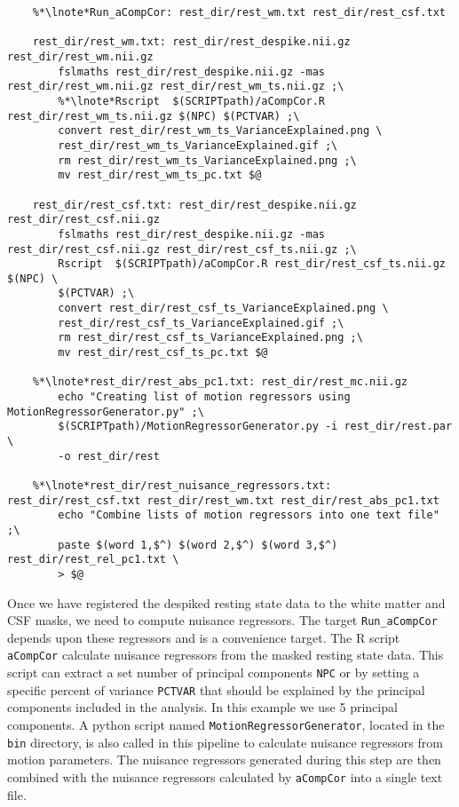 \begin{lstlisting}
	%*\lnote*Run_aCompCor: rest_dir/rest_wm.txt rest_dir/rest_csf.txt

	rest_dir/rest_wm.txt: rest_dir/rest_despike.nii.gz rest_dir/rest_wm.nii.gz
		fslmaths rest_dir/rest_despike.nii.gz -mas rest_dir/rest_wm.nii.gz rest_dir/rest_wm_ts.nii.gz ;\
		%*\lnote*Rscript  $(SCRIPTpath)/aCompCor.R rest_dir/rest_wm_ts.nii.gz $(NPC) $(PCTVAR) ;\
		convert rest_dir/rest_wm_ts_VarianceExplained.png \
		rest_dir/rest_wm_ts_VarianceExplained.gif ;\
		rm rest_dir/rest_wm_ts_VarianceExplained.png ;\
		mv rest_dir/rest_wm_ts_pc.txt $@

	rest_dir/rest_csf.txt: rest_dir/rest_despike.nii.gz rest_dir/rest_csf.nii.gz
		fslmaths rest_dir/rest_despike.nii.gz -mas rest_dir/rest_csf.nii.gz rest_dir/rest_csf_ts.nii.gz ;\
		Rscript  $(SCRIPTpath)/aCompCor.R rest_dir/rest_csf_ts.nii.gz $(NPC) \
		$(PCTVAR) ;\
		convert rest_dir/rest_csf_ts_VarianceExplained.png \
		rest_dir/rest_csf_ts_VarianceExplained.gif ;\
		rm rest_dir/rest_csf_ts_VarianceExplained.png ;\
		mv rest_dir/rest_csf_ts_pc.txt $@
		
	%*\lnote*rest_dir/rest_abs_pc1.txt: rest_dir/rest_mc.nii.gz
		echo "Creating list of motion regressors using MotionRegressorGenerator.py" ;\
		$(SCRIPTpath)/MotionRegressorGenerator.py -i rest_dir/rest.par \
		-o rest_dir/rest
		
	%*\lnote*rest_dir/rest_nuisance_regressors.txt: rest_dir/rest_csf.txt rest_dir/rest_wm.txt rest_dir/rest_abs_pc1.txt
		echo "Combine lists of motion regressors into one text file" ;\
		paste $(word 1,$^) $(word 2,$^) $(word 3,$^) rest_dir/rest_rel_pc1.txt \
		> $@
\end{lstlisting}

Once we have registered the despiked resting state data to the white matter and CSF masks, we need to compute nuisance regressors.  The target \texttt{Run_aCompCor} depends upon these regressors and is a convenience target.  The R script \texttt{aCompCor} calculate nuisance regressors from the masked resting state data. This script can extract a set number of principal components \texttt{NPC} or by setting a specific percent of variance \texttt{PCTVAR} that should be explained by the principal components included in the analysis. In this example we use 5 principal components. 
 \lnum{19}  A python script named \texttt{MotionRegressorGenerator}, located in the \texttt{bin} directory, is also called in this pipeline to calculate nuisance regressors from motion parameters.  The nuisance regressors generated during this step are then combined with the nuisance regressors calculated by \texttt{aCompCor} into a single text file. 

